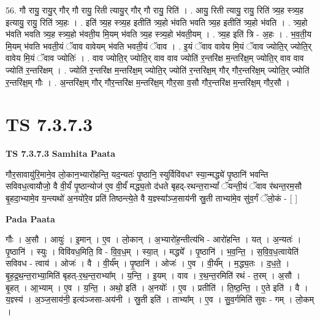 \documentclass[17pt]{extarticle}
\begin{document}
56. गौ रायु॒ रायु॒र् गौर् गौ रायु॒ रिती त्यायु॒र् गौर् गौ रायु॒ रिति॑ । . आयु॒ रिती त्यायु॒ रायु॒ रिति॑ त्र्य॒ह स्त्र्य॒ह इत्यायु॒ रायु॒ रिति॑ त्र्य॒हः । . इति॑ त्र्य॒ह स्त्र्य॒ह इतीति॑ त्र्य॒हो भ॑वति भवति त्र्य॒ह इतीति॑ त्र्य॒हो भ॑वति । . त्र्य॒हो भ॑वति भवति त्र्य॒ह स्त्र्य॒हो भ॑वती॒य मि॒यम् भ॑वति त्र्य॒ह स्त्र्य॒हो भ॑वती॒यम् । . त्र्य॒ह इति॑ त्रि - अ॒हः । . भ॒व॒ती॒य मि॒यम् भ॑वति भवती॒यं ॅवाव वावेयम् भ॑वति भवती॒यं ॅवाव । . इ॒यं ॅवाव वावेय मि॒यं ॅवाव ज्योति॒र् ज्योति॒र् वावेय मि॒यं ॅवाव ज्योतिः॑ । . वाव ज्योति॒र् ज्योति॒र् वाव वाव ज्योति॑ र॒न्तरि॑क्ष म॒न्तरि॑क्ष॒म् ज्योति॒र् वाव वाव ज्योति॑ र॒न्तरि॑क्षम् । . ज्योति॑ र॒न्तरि॑क्ष म॒न्तरि॑क्ष॒म् ज्योति॒र् ज्योति॑ र॒न्तरि॑क्ष॒म् गौर् गौर॒न्तरि॑क्ष॒म् ज्योति॒र् ज्योति॑ र॒न्तरि॑क्ष॒म् गौः । . अ॒न्तरि॑क्ष॒म् गौर् गौर॒न्तरि॑क्ष म॒न्तरि॑क्ष॒म् गौर॒सा व॒सौ गौर॒न्तरि॑क्ष म॒न्तरि॑क्ष॒म् गौर॒सौ । \newline
\pagebreak
{}

\section{ TS 7.3.7.3 }

\textbf{TS 7.3.7.3 } \newline
\textbf{Samhita Paata} \newline

गौर॒सावायु॑रि॒माने॒व लो॒कान॒भ्यारो॑हन्ति॒ यद॒न्यतः॑ पृ॒ष्ठानि॒ स्युर्विवि॑वधꣳ स्या॒न्मद्ध्ये॑ पृ॒ष्ठानि॑ भवन्ति सविवध॒त्वायौजो॒ वै वी॒र्यं॑ पृ॒ष्ठान्योज॑ ए॒व वी॒र्यं॑ मद्ध्य॒तो द॑धते बृहद्-रथन्त॒राभ्यां᳚ ॅयन्ती॒यं ॅवाव र॑थन्त॒रम॒सौ बृ॒हदा॒भ्यामे॒व य॒न्त्यथो॑ अ॒नयो॑रे॒व प्रति॑ तिष्ठन्त्ये॒ते वै य॒ज्ञ्स्या᳚ञ्ज॒साय॑नी स्रु॒ती ताभ्या॑मे॒व सु॑व॒र्गं ॅलो॒कं - [  ] \newline

\textbf{Pada Paata} \newline

गौः । अ॒सौ । आयुः॑ । इ॒मान् । ए॒व । लो॒कान् । अ॒भ्यारो॑ह॒न्तीत्य॑भि - आरो॑हन्ति । यत् । अ॒न्यतः॑ । पृ॒ष्ठानि॑ । स्युः । विवि॑वध॒मिति॒ वि - वि॒व॒ध॒म् । स्या॒त् । मद्ध्ये᳚ । पृ॒ष्ठानि॑ । भ॒व॒न्ति॒ । स॒वि॒व॒ध॒त्वायेति॑ सविवध - त्वाय॑ । ओजः॑ । वै । वी॒र्य᳚म् । पृ॒ष्ठानि॑ । ओजः॑ । ए॒व । वी॒र्य᳚म् । म॒द्ध्य॒तः । द॒ध॒ते॒ । बृ॒ह॒द्र॒थ॒न्त॒राभ्या॒मिति॑ बृहत्-र॒थ॒न्त॒राभ्या᳚म् । य॒न्ति॒ । इ॒यम् । वाव । र॒थ॒न्त॒रमिति॑ रथं - त॒रम् । अ॒सौ । बृ॒हत् । आ॒भ्याम् । ए॒व । य॒न्ति॒ । अथो॒ इति॑ । अ॒नयोः᳚ । ए॒व । प्रतीति॑ । ति॒ष्ठ॒न्ति॒ । ए॒ते इति॑ । वै । य॒ज्ञ्स्य॑ । अ॒ञ्ज॒साय॑नी॒ इत्य॑ञ्जसा-अय॑नी । स्रु॒ती इति॑ । ताभ्या᳚म् । ए॒व । सु॒व॒र्गमिति॑ सुवः - गम् । लो॒कम् ।  \newline
\end{document}

